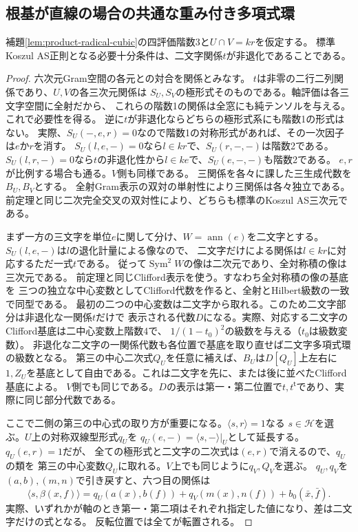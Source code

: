 \subsection{根基が直線の場合の共通な重み付き多項式環}
\begin{theorem}[根基直線の完全判定]\label{thm:radical-factor-amalgam}
補題\ref{lem:product-radical-cubic}の四評価階数3と$U\cap V=kr$を仮定する。
標準Koszul AS正則となる必要十分条件は、二文字関係$t$が非退化であることである。
\end{theorem}
\begin{proof}
六次元Gram空間の各元との対合を関係とみなす。
$t$は非零の二行二列関係であり、$U,V$の各三次元関係は
$S_U,S_V$の極形式そのものである。軸評価は各三文字空間に全射だから、
これらの階数1の関係は全窓にも純テンソルを与える。これで必要性を得る。
逆に$t$が非退化ならどちらの極形式系にも階数1の形式はない。
実際、$S_U(-,e,r)=0$なので階数1の対称形式があれば、その一次因子は$e$か$r$を消す。
$S_U(l,e,-)=0$なら$l\in kr$で、$S_U(r,-,-)$は階数2である。
$S_U(l,r,-)=0$なら$t$の非退化性から$l\in ke$で、$S_U(e,-,-)$も階数2である。
$e,r$が比例する場合も通る。$V$側も同様である。
三関係を各々に課した三生成代数を$B_U,B_V$とする。
全射Gram表示の双対の単射性により三関係は各々独立である。
前定理と同じ二次完全交叉の双対性により、どちらも標準のKoszul AS三次元である。

まず一方の三文字を単位$e$に関して分け、$W=\operatorname{ann}(e)$を二文字とする。
$S_U(l,e,-)$は$l$の退化計量による像なので、
二文字だけによる関係は$l\in kr$に対応するただ一式$t$である。
従って$\operatorname{Sym}^2 W$の像は二次元であり、全対称積の像は三次元である。
前定理と同じClifford表示を使う。すなわち全対称積の像の基底を
三つの独立な中心変数としてClifford代数を作ると、全射とHilbert級数の一致で同型である。
最初の二つの中心変数は二文字から取れる。このため二文字部分は非退化な一関係$t$だけで
表示される代数$D$になる。実際、対応する二文字のClifford基底は二中心変数上階数4で、
$1/(1-t_0)^2$の級数を与える（$t_0$は級数変数）。
非退化な二文字の一関係代数も各位置で基底を取り直せば二文字多項式環の級数となる。
第三の中心二次式$Q_U$を任意に補えば、$B_U$は$D[Q_U]$上左右に
$1,Z_U$を基底として自由である。これは二文字を先に、または後に並べたClifford基底による。
$V$側でも同じである。$D$の表示は第一・第二位置で$t,t^{\mathsf t}$であり、実際に同じ部分代数である。

ここで二側の第三の中心式の取り方が重要になる。$\langle s,r\rangle=1$なる
$s\in\mathcal H$を選ぶ。$U$上の対称双線型形式$q_U$を
$q_U(e,-)=\langle s,-\rangle|_U$として延長する。$q_U(e,r)=1$だが、
全ての極形式と二文字の二次式は$(e,r)$で消えるので、$q_U$の類を
第三の中心変数$Q_U$に取れる。$V$上でも同じように$q_V,Q_V$を選ぶ。
$q_U,q_V$を$(a,b),(m,n)$で引き戻すと、六つ目の関係は
\[
 \langle s,\beta(x,f)\rangle=q_U(a(x),b(f))+q_V(m(x),n(f))+b_0(\bar x,\bar f).
\]
実際、いずれかが軸のとき第一・第二項はそれぞれ指定した値になり、差は二文字だけの式となる。
反転位置では全てが転置される。


\end{proof}
